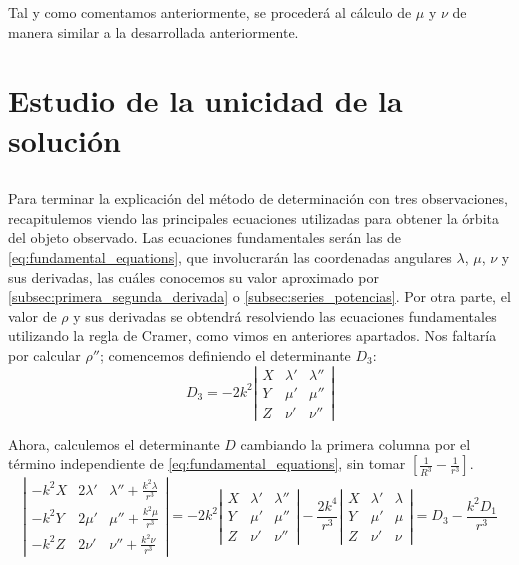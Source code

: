 \documentclass[11pt]{article}
\begin{document}
Tal y como comentamos anteriormente, se procederá al cálculo de $\mu$ y $\nu$ de manera similar a la desarrollada anteriormente.

\newpage


\section{Estudio de la unicidad de la solución}

\subsection{}
\label{subsec:fundamental_equations}
Para terminar la explicación del método de determinación con tres observaciones, recapitulemos viendo las principales ecuaciones utilizadas para obtener la órbita del objeto observado. Las ecuaciones fundamentales serán las de \eqref{eq:fundamental_equations}, que involucrarán las coordenadas angulares $\lambda$, $\mu$, $\nu$ y sus derivadas, las cuáles conocemos su valor aproximado por \ref{subsec:primera_segunda_derivada} o \ref{subsec:series_potencias}. Por otra parte, el valor de $\rho$ y sus derivadas se obtendrá resolviendo las ecuaciones fundamentales utilizando la regla de Cramer, como vimos en anteriores apartados. Nos faltaría por calcular $\rho''$; comencemos definiendo el determinante $D_3$:
\[
D_3=-2k^2
\left|
\begin{array}{ccc}
X & \lambda' & \lambda''\\
Y & \mu' & \mu''\\
Z & \nu' & \nu''
\end{array}
\right|
\]

Ahora, calculemos el determinante $D$ cambiando la primera columna por el término independiente de \eqref{eq:fundamental_equations}, sin tomar $[\frac{1}{R^3}-\frac{1}{r^3}]$. 
\[
\left|
\begin{array}{ccc}
-k^2X & 2\lambda' & \lambda''+\frac{k^2\lambda}{r^3}\\
-k^2Y & 2\mu' & \mu''+\frac{k^2\mu}{r^3}\\
-k^2Z & 2\nu' & \nu''+\frac{k^2\nu}{r^3}
\end{array}
\right|
=-2k^2
\left|
\begin{array}{ccc}
X & \lambda' & \lambda''\\
Y & \mu' & \mu''\\
Z & \nu' & \nu''
\end{array}
\right|
-\frac{2k^4}{r^3}
\left|
\begin{array}{ccc}
X & \lambda' & \lambda\\
Y & \mu' & \mu\\
Z & \nu' & \nu
\end{array}
\right|
=
D_3-\frac{k^2D_1}{r^3}
\]
\end{document}
